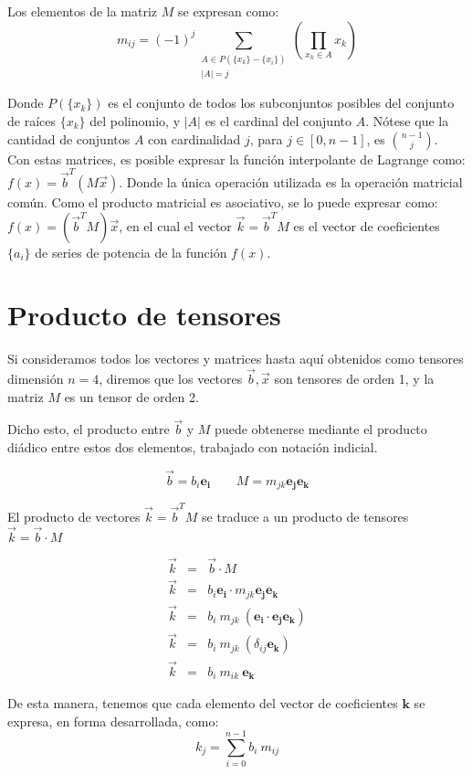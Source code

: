 \documentclass[12pt]{article}
\begin{document}
Los elementos de la matriz $M$ se expresan como:
\[ m_{ij} = (-1)^j \sum_{\substack{A \in P(\{x_k\}-\{x_i\}) \\ |A|=j}} \left( \prod_{x_k\in A } x_k \right) \]

Donde $P(\{x_k\})$ es el conjunto de todos los subconjuntos posibles del conjunto de ra\'ices $\{x_k\}$ del polinomio, y $|A|$ es el cardinal del conjunto $A$. N\'otese que la cantidad de conjuntos $A$ con cardinalidad $j$, para $j\in [0,n-1]$, es ${n-1 \choose j}$.\\

Con estas matrices, es posible expresar la funci\'on interpolante de Lagrange como: $ f(x) = \vec{b}^T (M \vec{x}) $. Donde la \'unica operaci\'on utilizada es la operaci\'on matricial com\'un. Como el producto matricial es asociativo, se lo puede expresar como: $ f(x) = (\vec{b}^T M) \vec{x} $, en el cual el vector $\vec{k} = \vec{b}^T M$ es el vector de coeficientes $\{a_i\}$ de series de potencia de la funci\'on $f(x)$.\\

\section*{Producto de tensores}
Si consideramos todos los vectores y matrices hasta aqu\'i obtenidos como tensores dimensi\'on $n=4$, diremos que los vectores $\vec{b}, \vec{x}$ son tensores de orden 1, y la matriz $M$ es un tensor de orden 2.

Dicho esto, el producto entre $\vec{b}$ y $M$ puede obtenerse mediante el producto di\'adico entre estos dos elementos, trabajado con notaci\'on indicial.

\[
\vec{b} = b_i \mathbf{e_i} \qquad M = m_{jk}\mathbf{e_j e_k}
\]

El producto de vectores $\vec{k} = \vec{b}^T M$ se traduce a un producto de tensores $\vec{k} = \vec{b} \cdot M$

\begin{eqnarray*}
\vec{k} &=& \vec{b} \cdot M\\
\vec{k} &=& b_i \mathbf{e_i} \cdot m_{jk}\mathbf{e_j e_k}\\
\vec{k} &=& b_i\ m_{jk}\ (\mathbf{e_i} \cdot \mathbf{e_j e_k})\\
\vec{k} &=& b_i\ m_{jk}\ (\delta_{ij} \mathbf{e_k})\\
\vec{k} &=& b_i\ m_{ik}\ \mathbf{e_k}
\end{eqnarray*}

De esta manera, tenemos que cada elemento del vector de coeficientes $\mathbf{k}$ se expresa, en forma desarrollada, como: \[ k_j = \sum\limits_{i=0}^{n-1} b_i\ m_{ij}\]
\end{document}
